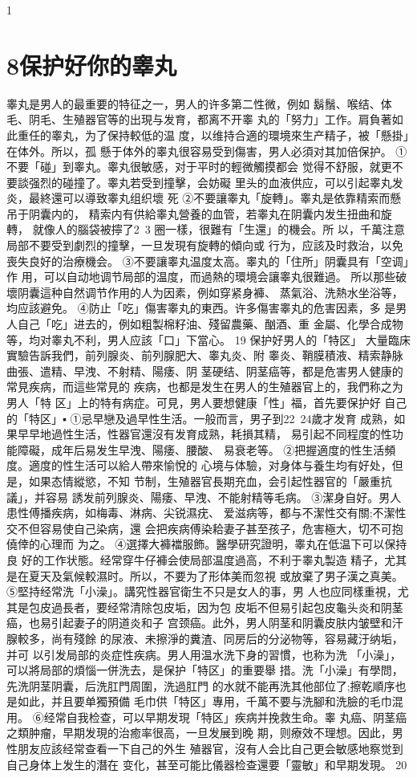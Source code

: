 \documentclass[12pt,UTF8]{ctexbook}
\begin{document}
1\section{8保护好你的睾丸}
睾丸是男人的最重要的特征之一，男人的许多第二性微，例如
鬍鬚、喉结、体毛、阴毛、生殖器官等的出現与发育，都离不开睾
丸的「努力」工作。肩負著如此重任的睾丸，为了保持較低的温
度，以维持合適的環境來生产精子，被「懸掛」在体外。所以，孤
懸于体外的睾丸很容易受到傷害，男人必須对其加倍保护。
①不要「碰」到睾丸。睾丸很敏感，对于平时的輕微觸摸都会
觉得不舒服，就更不要談强烈的碰撞了。睾丸若受到撞擊，会妨礙
里头的血液供应，可以引起睾丸发炎，最終還可以導致睾丸组织壞
死
②不要讓睾丸「旋轉」。睾丸是依靠精索而懸吊于阴囊内的，
精索内有供給睾丸營養的血管，若睾丸在阴囊内发生扭曲和旋轉，
就像人的腦袋被擰了2~3 圈一樣，很難有「生還」的機会。所
以，千萬注意局部不要受到劇烈的撞擊，一旦发現有旋轉的傾向或
行为，应該及时救治，以免喪失良好的治療機会。
③不要讓睾丸温度太高。睾丸的「住所」阴囊具有「空调」作
用，可以自动地调节局部的温度，而過熱的環境会讓睾丸很難過。
所以那些破壞阴囊這种自然调节作用的人为因素，例如穿紧身褲、
蒸氣浴、洗熱水坐浴等，均应該避免。
④防止「吃」傷害睾丸的東西。许多傷害睾丸的危害因素，多
是男人自己「吃」进去的，例如粗製棉籽油、殘留農藥、酗酒、重
金屬、化學合成物等，均对睾丸不利，男人应該「口」下當心。
19 保护好男人的「特区」
大量臨床實驗告訴我們，前列腺炎、前列腺肥大、睾丸炎、附
睾炎、鞘膜積液、精索静脉曲張、遣精、早洩、不射精、陽痿、阴
茎硬结、阴茎癌等，都是危害男人健康的常見疾病，而這些常見的
疾病，也都是发生在男人的生殖器官上的，我們称之为男人「特
区」上的特有病症。可見，男人要想健康「性」福，首先要保护好
自己的「特区」▪
①忌早戀及過早性生活。一般而言，男子到22~24歲才发育
成熟，如果早早地過性生活，性器官還沒有发育成熟，耗損其精，
易引起不同程度的性功能障礙，成年后易发生早洩、陽痿、腰酸、
易衰老等。
②把握適度的性生活頻度。適度的性生活可以給人帶來愉悅的
心境与体驗，对身体与養生均有好处，但是，如果态情縱慾，不知
节制，生殖器官長期充血，会引起性器官的「嚴重抗議」，并容易
誘发前列腺炎、陽痿、早洩、不能射精等毛病。
③潔身自好。男人患性傅播疾病，如梅毒、淋病、尖锐濕疣、
爱滋病等，都与不潔性交有關;不潔性交不但容易使自己染病，還
会把疾病傅染耠妻子甚至孩子，危害極大，切不可抱僥倖的心理而
为之。
④選擇大褲襠服飾。醫學研究證明，睾丸在低温下可以保持良
好的工作状態。经常穿牛仔褲会使局部温度過高，不利于睾丸製造
精子，尤其是在夏天及氣候較濕时。所以，不要为了形体美而忽視
或放棄了男子漢之真美。
⑤堅持经常洗「小澡」。講究性器官衛生不只是女人的事，男
人也应同樣重視，尤其是包皮過長者，要经常清除包皮垢，因为包
皮垢不但易引起包皮龜头炎和阴茎癌，也易引起妻子的阴道炎和子
宫颈癌。此外，男人阴茎和阴囊皮肤内皱壁和汗腺較多，尚有殘餘
的尿液、未擦淨的糞渣、同房后的分泌物等，容易藏汙纳垢，并可
以引发局部的炎症性疾病。男人用温水洗下身的習慣，也称为洗
「小澡」，可以將局部的煩惱一併洗去，是保护「特区」的重要舉
措。洗「小澡」有學問，先洗阴茎阴囊，后洗肛門周圍，洗過肛門
的水就不能再洗其他部位了;擦乾順序也是如此，并且要单獨預備
毛巾供「特区」專用，千萬不要与洗腳和洗臉的毛巾混用。
⑥经常自我检查，可以早期发現「特区」疾病并挽救生命。睾
丸癌、阴茎癌之類肿瘤，早期发現的治癒率很高，一旦发展到晚
期，则療效不理想。因此，男性朋友应該经常查看一下自己的外生
殖器官，沒有人会比自己更会敏感地察觉到自己身体上发生的潛在
变化，甚至可能比儀器检查還要「靈敏」和早期发現。
20
\end{document}
